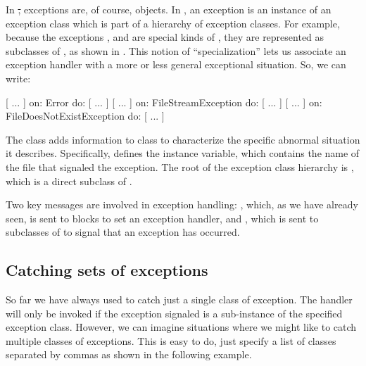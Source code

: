\documentclass[a4paper,10pt,twoside]{book}
\begin{document}
In \st, exceptions are, of course, objects. 
In \pharo{}, an exception is an instance of an exception class which is part of a hierarchy of exception classes.
For example, 
because the exceptions ,  and  are special kinds of , they are represented as subclasses of , as shown in .
This notion of ``specialization'' lets us associate an exception handler with a more or less general exceptional situation.
So, we can write:
\begin{code}{}
[ ... ] on: Error do: [ ... ]
[ ... ] on: FileStreamException do: [ ... ]
[ ... ] on: FileDoesNotExistException do: [ ... ]
\end{code}


The class  adds information to class  to characterize the specific abnormal situation it describes. Specifically,  defines the  instance variable, which contains the name of the file that signaled the exception. The root of the exception class hierarchy is , which is a direct subclass of .


Two key messages are involved in exception handling: , which, as we have already seen, is sent to blocks to set an exception handler, and , which is sent to subclasses of  to signal that an exception has occurred.

\subsection{Catching sets of exceptions}

So far we have always used  to catch just a single class of exception. The handler will only be invoked if the exception signaled is a sub-instance of the specified exception class.
However, we can imagine situations where we might like to catch multiple classes of exceptions. This is easy to do, just specify a list of classes separated by commas as shown in the following example.
\end{document}
